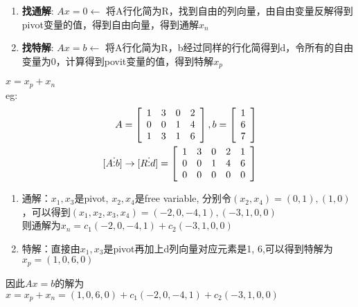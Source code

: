 \documentclass{book}
\begin{document}
\begin{enumerate}
  \item \textbf{找通解}: $Ax=0\leftarrow$ 将A行化简为R，找到自由的列向量，由自由变量反解得到pivot变量的值，得到自由向量，得到通解$x_n$
  \item \textbf{找特解}: $Ax=b\leftarrow$ 将A行化简为R，b经过同样的行化简得到d，令所有的自由变量为0，计算得到povit变量的值，得到特解$x_p$
\end{enumerate}
$x=x_p+x_n$\\
eg: \\ 
\begin{equation*}
  \begin{aligned}
    A&=\left[
      \begin{array}{c c c c }
        1 & 3 & 0 & 2\\ 
        0 & 0 & 1 & 4\\ 
        1 & 3 & 1 & 6
      \end{array}
    \right], 
  b=\left[
    \begin{array}{c }
     1\\6\\7
    \end{array}
  \right]\\ 
[A\vdots b]&\rightarrow[R\vdots d]=\left[
  \begin{array}{c c c c c }
    1 & 3 & 0 & 2 &1\\ 
    0 & 0 & 1 & 4 &6\\ 
    0 & 0 & 0 & 0 &0
  \end{array}
\right]
  \end{aligned} 
\end{equation*}
\begin{enumerate}
  \item 通解：$x_1, x_3$是pivot, $x_2, x_4$是free variable, 分别令$(x_2, x_4)=(0, 1), (1, 0)$，可以得到$(x_1, x_2, x_3, x_4)=(-2, 0, -4, 1), (-3, 1, 0, 0)$\\ 
    则通解为$x_n=c_1(-2, 0, -4, 1)+c_2(-3, 1,0, 0)$
  \item 特解：直接由$x_1, x_3$是pivot再加上d列向量对应元素是1, 6,可以得到特解为$x_p=(1, 0, 6, 0)$
\end{enumerate}
因此$Ax=b$的解为$x=x_p+x_n=(1, 0, 6, 0)+c_1(-2, 0, -4, 1)+c_2(-3, 1,0, 0)$

\end{document}
